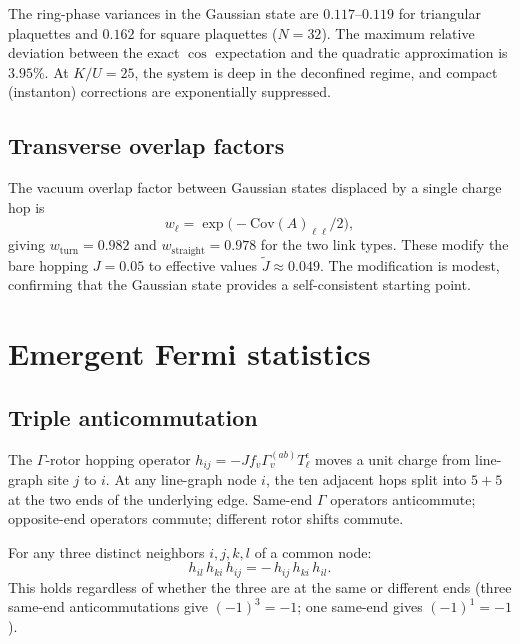 \documentclass[aps,prb,twocolumn,superscriptaddress,showpacs]{revtex4-2}
\begin{document}
The ring-phase variances in the Gaussian state are $0.117$--$0.119$
for triangular plaquettes and $0.162$ for square plaquettes ($N=32$).
The maximum relative deviation between the exact $\cos$ expectation
and the quadratic approximation is $3.95\%$. At $K/U=25$, the system
is deep in the deconfined regime, and compact (instanton) corrections
are exponentially suppressed.

\subsection{Transverse overlap factors}

The vacuum overlap factor between Gaussian states displaced by a single
charge hop is
\begin{equation}
w_\ell = \exp\bigl(-\mathrm{Cov}(A)_{\ell\ell}/2\bigr),
\end{equation}
giving $w_{\mathrm{turn}}=0.982$ and $w_{\mathrm{straight}}=0.978$ for the
two link types. These modify the bare hopping $J=0.05$ to effective values
$\tilde{J}\approx 0.049$. The modification is modest, confirming that the
Gaussian state provides a self-consistent starting point.

\section{Emergent Fermi statistics}
\label{sec:fermi}

\subsection{Triple anticommutation}

The $\Gamma$-rotor hopping operator
$h_{ij}=-Jf_v\Gamma_v^{(ab)}T_\ell^\epsilon$ moves a unit charge from
line-graph site $j$ to $i$. At any line-graph node $i$, the ten
adjacent hops split into $5+5$ at the two ends of the underlying edge.
Same-end $\Gamma$ operators anticommute; opposite-end operators commute;
different rotor shifts commute.

For any three distinct neighbors $i,j,k,l$ of a common node:
\begin{equation}
h_{il}\,h_{ki}\,h_{ij} = -\,h_{ij}\,h_{ki}\,h_{il}.
\label{eq:fermi_exchange}
\end{equation}
This holds regardless of whether the three are at the same or different
ends (three same-end anticommutations give $(-1)^3=-1$; one same-end
gives $(-1)^1=-1$).
\end{document}
